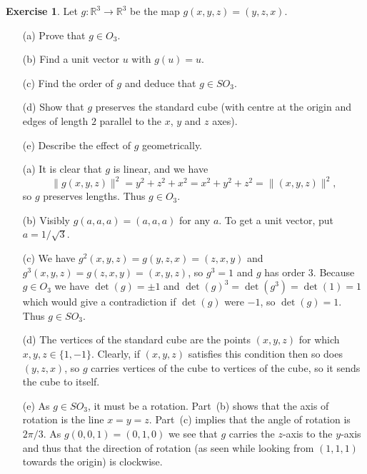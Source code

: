 \documentclass{amsart}
\newcommand{\xra}{\xrightarrow}
\renewcommand{\:}{\colon}
\newcommand{\R}{\mathbb{R}}
\theoremstyle{definition}
\newtheorem{exercise}{Exercise}
\newenvironment{solution}{{\noindent\bf Solution:}}{}
\begin{document}
\begin{exercise}
 Let $g\:\R^3\xra{}\R^3$ be the map $g(x,y,z)=(y,z,x)$.
 \begin{itemize}
 \item[(a)] Prove that $g\in O_3$.
 \item[(b)] Find a unit vector $u$ with $g(u)=u$.
 \item[(c)] Find the order of $g$ and deduce that $g\in SO_3$.
 \item[(d)] Show that $g$ preserves the standard cube (with centre at the
  origin and edges of length $2$ parallel to the $x$, $y$ and $z$
  axes). 
 \item[(e)] Describe the effect of $g$ geometrically.
 \end{itemize}
\end{exercise}
\begin{solution}
 \begin{itemize}
 \item[(a)] It is clear that $g$ is linear, and we have 
  \[ \|g(x,y,z)\|^2=y^2+z^2+x^2=x^2+y^2+z^2=\|(x,y,z)\|^2, \]
  so $g$ preserves lengths.  Thus $g\in O_3$.
 \item[(b)] Visibly $g(a,a,a)=(a,a,a)$ for any $a$.  To get a unit
  vector, put $a=1/\sqrt{3}$.
 \item[(c)] We have $g^2(x,y,z)=g(y,z,x)=(z,x,y)$ and
  $g^3(x,y,z)=g(z,x,y)=(x,y,z)$, so $g^3=1$ and $g$ has order $3$.
  Because $g\in O_3$ we have $\det(g)=\pm 1$ and
  $\det(g)^3=\det(g^3)=\det(1)=1$ which would give a contradiction if
  $\det(g)$ were $-1$, so $\det(g)=1$.  Thus $g\in SO_3$.  
 \item[(d)] The vertices of the standard cube are the points $(x,y,z)$ for
  which $x,y,z\in\{1,-1\}$.  Clearly, if $(x,y,z)$ satisfies this
  condition then so does $(y,z,x)$, so $g$ carries vertices of the
  cube to vertices of the cube, so it sends the cube to itself.
 \item[(e)] As $g\in SO_3$, it must be a rotation.  Part~(b) shows
  that the axis of rotation is the line $x=y=z$.  Part~(c) implies
  that the angle of rotation is $2\pi/3$.  As $g(0,0,1)=(0,1,0)$ we
  see that $g$ carries the $z$-axis to the $y$-axis and thus that the
  direction of rotation (as seen while looking from $(1,1,1)$ towards
  the origin) is clockwise.
 \end{itemize}
\end{solution}
\end{document}
